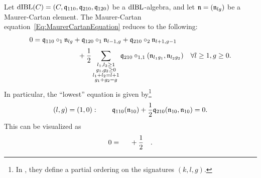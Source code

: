 \documentclass[\MainFolder/Text.tex]{subfiles}
\begin{document}
\begin{Proposition}\label{Prop:dIBL}
Let $\mathrm{dIBL}(C) = (C,\mathfrak{q}_{110},\mathfrak{q}_{210},\mathfrak{q}_{120})$ be a $\mathrm{dIBL}$-algebra, and let $\mathfrak{n} = (\mathfrak{n}_{lg})$ be a Maurer-Cartan element. The Maurer-Cartan equation~\eqref{Eq:MaurerCartanEquation} reduces to the following:
$$ 
\begin{multlined}[b] 0 = \OPQ_{110}\circ_1 \PMC_{lg} + \OPQ_{120} \circ_1 \PMC_{l-1,g} +  \OPQ_{210}\circ_2 \PMC_{l+1,g-1} \\[\jot]+  \frac{1}{2}\sum_{\substack{l_1, l_2\ge 1 \\ g_1, g_2 \ge 0 \\ l_1 + l_2 = l + 1 \\ g_1 + g_2 = g}} \OPQ_{210}\circ_{1,1}(\PMC_{l_1 g_1}, \PMC_{l_2 g_2}) \end{multlined}\quad \forall l\ge1 , g\ge 0.
$$
In particular, the ``lowest'' equation is given by\footnote{In \cite[Definition 2.4.]{Cieliebak2015}, they define a partial ordering on the signatures $(k,l,g)$.}
\begin{equation} \label{Eq:MCEq}
(l,g) = (1,0): \qquad \mathfrak{q}_{110}(\mathfrak{n}_{10}) + \frac{1}{2}\mathfrak{q}_{210}(\mathfrak{n}_{10}, \mathfrak{n}_{10}) = 0.
\end{equation}
This can be visualized as
{\begingroup \def\dist{0.25} %
  \def\rad{0.5} %
  \def\ecc{0.1} %
  \def\hght{1} %
  \def\dif{1.5} %
  \def\radO{\rad} %
  \def\eccO{\ecc} %
  \def\hghtO{2*\hght+\dist} %
  \def\difO{\dif} %
  \def\gencanc{0.05} %
  \def\genecc{20} %
  \def\genrad{0.45} %
$$0 =\quad \vcenterline{}\; + \frac{1}{2} \quad \vcenterline{}. $$
\endgroup}


\end{Proposition}
\end{document}
